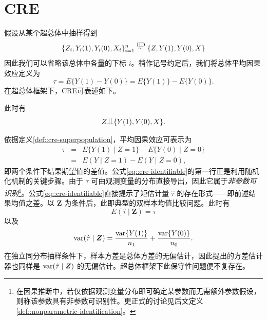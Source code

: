 \section{CRE}\label{sec::cre-superpop}

假设从某个超总体中抽样得到
$$
\{  Z_i, Y_i(1), Y_i(0),  X_i  \}_{i=1}^n  \stackrel{\textup{IID}}{\sim} \{  Z, Y(1), Y(0), X \}
$$
因此我们可以省略该总体中各量的下标 $i$。稍作记号约定后，我们将总体平均因果效应定义为
$$
\tau  = E\{  Y(1)  - Y(0)\}  = E\{  Y(1)  \} -  E\{ Y(0)\} .
$$
在超总体框架下，CRE可表述如下。

\begin{definition}
[超总体框架下的CRE]
\label{def::cre-superpopulation}
此时有
$$
Z \ind \{  Y(1), Y(0), X \} .
$$
\end{definition}

依据定义\ref{def::cre-superpopulation}，平均因果效应可表示为
\begin{eqnarray}
\tau &=& E\{  Y(1) \mid Z=1\}  - E\{  Y(0) \mid Z=0 \}   \nonumber  \\
&=& E( Y \mid Z=1)  - E(  Y \mid Z=0 ),
\label{eq::cre-identifiable}
\end{eqnarray}
即两个条件下结果期望值的差值。公式\eqref{eq::cre-identifiable}的第一行正是利用随机化机制的关键步骤。由于 $\tau  $ 可由观测变量的分布直接导出，因此它属于{\it 非参数可识别}\footnote{在因果推断中，若仅依据观测变量分布即可确定某参数而无需额外参数假设，则称该参数具有非参数可识别性。更正式的讨论见后文定义\ref{def::nonparametric-identification}。}。公式\eqref{eq::cre-identifiable}直接提示了矩估计量 $\hat{\tau}$ 的存在形式——即前述结果均值之差。以 $\bm{Z}$ 为条件后，此即典型的双样本均值比较问题。此时有
$$
E(  \hat{\tau} \mid \bm{Z}) = \tau
$$
以及
$$
\textup{var} (  \hat{\tau} \mid \bm{Z}) =   \frac{ \textup{var}\{ Y(1) \}}{n_1} + \frac{ \textup{var}\{ Y(0) \}}{n_0}.
$$
在独立同分布抽样条件下，样本方差是总体方差的无偏估计，因此\citet{Neyman:1923}提出的方差估计器也同样是 $\textup{var} (  \hat{\tau} \mid \bm{Z}) $ 的无偏估计。超总体框架下此保守性问题便不复存在。


